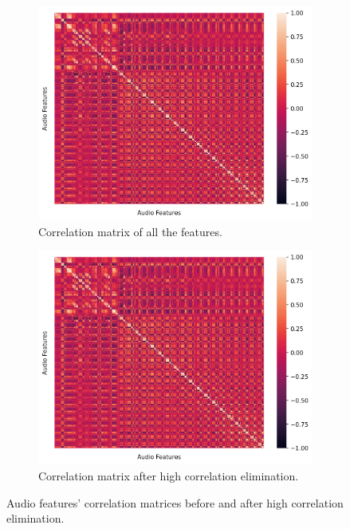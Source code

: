 \begin{figure}
	\centering
	\begin{subfigure}{.5\textwidth}
		\centering
		\includegraphics[width=\linewidth]{figs/4_1_traditional/allCorrMatrix.png}
		\caption{Correlation matrix of all the features.}
		\label{fig:allAudioFeat}
	\end{subfigure}%
	\begin{subfigure}{.5\textwidth}
		\centering
		\includegraphics[width=\linewidth]{figs/4_1_traditional/highCorrMatrix.png}
		\caption{Correlation matrix after high correlation elimination.}
		\label{fig:highAudioFeat}
	\end{subfigure}
	\caption{Audio features' correlation matrices before and after high correlation elimination.}
\end{figure}



